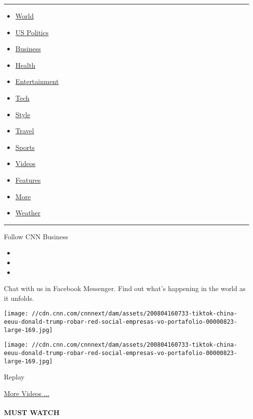 \begin{center}\rule{0.5\linewidth}{\linethickness}\end{center}

\begin{itemize}
\tightlist
\item
  \href{/world}{World}
\item
  \href{/politics}{US Politics}
\item
  \href{/business}{Business}
\item
  \href{/health}{Health}
\item
  \href{/entertainment}{Entertainment}
\item
  \href{/business/tech}{Tech}
\item
  \href{/style}{Style}
\item
  \href{/travel}{Travel}
\item
  \href{/sport}{Sports}
\item
  \href{/videos}{Videos}
\item
  \href{/specials}{Features}
\item
  \href{/more}{More}
\item
  \href{/weather}{Weather}
\end{itemize}

\begin{center}\rule{0.5\linewidth}{\linethickness}\end{center}

Follow CNN Business

\begin{itemize}
\item
\item
\item
\end{itemize}

Chat with us in Facebook Messenger. Find out what's happening in the
world as it unfolds.

\texttt{[image: //cdn.cnn.com/cnnnext/dam/assets/200804160733-tiktok-china-eeuu-donald-trump-robar-red-social-empresas-vo-portafolio-00000823-large-169.jpg]}

\texttt{[image: //cdn.cnn.com/cnnnext/dam/assets/200804160733-tiktok-china-eeuu-donald-trump-robar-red-social-empresas-vo-portafolio-00000823-large-169.jpg]}\href{javascript:void(0);}{}

Replay

\href{/videos}{More Videos ...}

\hypertarget{must-watch}{%
\paragraph{MUST WATCH}\label{must-watch}}


